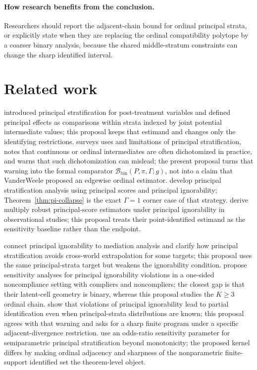 \documentclass[11pt]{article}
\theoremstyle{definition}
\theoremstyle{plain}
\theoremstyle{remark}
\begin{document}
\paragraph{How research benefits from the conclusion.}
Researchers should report the adjacent-chain bound for ordinal principal strata, or explicitly state when they are replacing the ordinal compatibility polytope by a coarser binary analysis, because the shared middle-stratum constraints can change the sharp identified interval.

\section{Related work}
\citet{FrangakisRubin2002} introduced principal stratification for post-treatment variables and defined principal effects as comparisons within strata indexed by joint potential intermediate values; this proposal keeps that estimand and changes only the identifying restrictions.  \citet{VanderWeele2011} surveys uses and limitations of principal stratification, notes that continuous or ordinal intermediates are often dichotomized in practice, and warns that such dichotomization can mislead; the present proposal turns that warning into the formal comparator \(\mathcal B_{\mathrm{bin}}(P,\pi,\Gamma;g)\), not into a claim that VanderWeele proposed an edgewise ordinal estimator.  \citet{DingLu2017} develop principal stratification analysis using principal scores and principal ignorability; Theorem~\ref{thm:pi-collapse} is the exact \(\Gamma=1\) corner case of that strategy.  \citet{JiangYangDing2022} derive multiply robust principal-score estimators under principal ignorability in observational studies; this proposal treats their point-identified estimand as the sensitivity baseline rather than the endpoint.

\citet{ForastiereMatteiDing2018} connect principal ignorability to mediation analysis and clarify how principal stratification avoids cross-world extrapolation for some targets; this proposal uses the same principal-strata target but weakens the ignorability condition.  \citet{NguyenStuartScharfsteinOgburn2024} propose sensitivity analyses for principal ignorability violations in a one-sided noncompliance setting with compliers and noncompliers; the closest gap is that their latent-cell geometry is binary, whereas this proposal studies the \(K\ge3\) ordinal chain.  \citet{WuAntonelli2024} show that violations of principal ignorability lead to partial identification even when principal-strata distributions are known; this proposal agrees with that warning and asks for a sharp finite program under a specific adjacent-divergence restriction.  \citet{TongKahanHarhayLi2025} use an odds-ratio sensitivity parameter for semiparametric principal stratification beyond monotonicity; the proposed kernel differs by making ordinal adjacency and sharpness of the nonparametric finite-support identified set the theorem-level object.
\end{document}
